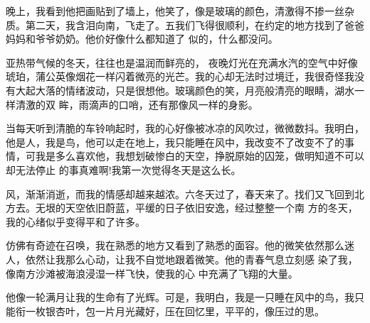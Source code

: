 \documentclass{article}
\begin{document}
晚上，我看到他把画贴到了墙上，他笑了，像是玻璃的颜色，清激得不掺一丝杂质。第二天，我含泪向南，飞走了。五我们飞得很顺利，在约定的地方找到了爸爸妈妈和爷爷奶奶。他价好像什么都知道了
似的，什么都没问。 

亚热带气候的冬天，往往也是温润而鲜亮的，
\newpage
夜晚灯光在充满水汽的空气中好像琥珀，蒲公英像烟花一样闪着微亮的光芒。我的心却无法时过境迁，我很奇怪我没有大起大落的情绪波动，只是很想他。玻璃颜色的笑，月亮般清亮的眼睛，湖水一样清激的双
眸，雨滴声的口哨，还有那像风一样的身影。 

当每天听到清脆的车铃响起时，我的心好像被冰凉的风吹过，微微数抖。我明白，他是人，我是鸟，他可以走在地上，我只能睡在风中，我改变不了改变不了的事情，可我是多么喜欢他，我想划破惨白的天空，挣脱原始的囚笼，做明知道不可以却无法停止
的事真难啊!我第一次觉得冬天是这么长。 

风，渐渐消逝，而我的情感却越来越浓。六冬天过了，春天来了。找们又飞回到北方去。无垠的天空依旧蔚蓝，平缓的日子依旧安逸，经过整整一个南
方的冬天，我的心绪似乎变得平和了许多。 

仿佛有奇迹在召唤，我在熟悉的地方又看到了熟悉的面容。他的微笑依然那么迷人，依然让我那么心动，让我不自觉地跟着微笑。他的青春气息立刻感
\newpage
染了我，像南方沙滩被海浪浸湿一样飞快，使我的心
中充满了飞翔的大量。 

他像一轮满月让我的生命有了光辉。可是，我明白，我是一只睡在风中的鸟，我只能衔一枚银杏叶，包一片月光藏好，压在回忆里，平平的，像压过的思。
\end{document}
